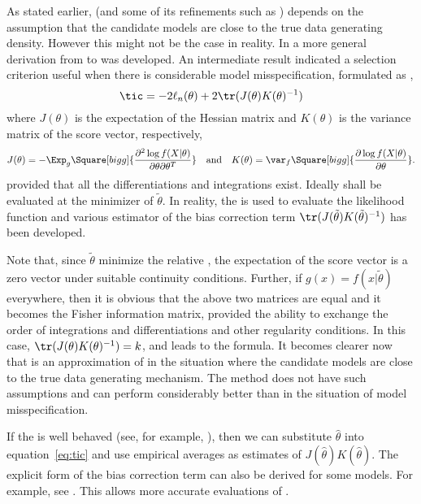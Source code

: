 As stated earlier, \aic (and some of its refinements such as \aicc) depends on
the assumption that the candidate models are close to the true data generating
density. However this might not be the case in reality. In
\cite{Takeuchi:1976vx} a more general derivation from \kld to \aic was
developed. An intermediate result indicated a selection criterion useful when
there is considerable model misspecification, formulated as \tic,
\begin{equation}
  \tic = -2\ell_n(\theta) + 2\tr(J(\theta)K(\theta)^{-1})
  \label{eq:tic}
\end{equation}
where $J(\theta)$ is the expectation of the Hessian matrix and $K(\theta)$ is
the variance matrix of the score vector, respectively,
\begin{equation}
  J(\theta) = -\Exp_g\Square[bigg]{
    \frac{\partial^2\log f(X|\theta)}{\partial\theta\partial\theta^T}
  }\quad\text{and}\quad
  K(\theta) = \var_f\Square[bigg]{
    \frac{\partial\log f(X|\theta)}{\partial\theta}
  }.
\end{equation}
provided that all the differentiations and integrations exist. Ideally \tic
shall be evaluated at the minimizer of \kld $\tilde\theta$. In reality, the
\mle is used to evaluate the likelihood function and various estimator of the
bias correction term $\tr(J(\tilde\theta)K(\tilde\theta)^{-1})$ has been
developed.

Note that, since $\tilde\theta$ minimize the relative \kld, the expectation of
the score vector is a zero vector under suitable continuity conditions.
Further, if $g(x) = f(x|\tilde\theta)$ everywhere, then it is obvious that the
above two matrices are equal and it becomes the Fisher information matrix,
provided the ability to exchange the order of integrations and
differentiations and other regularity conditions. In this case,
$\tr(J(\theta)K(\theta)^{-1}) = k$, and \tic leads to the \aic formula. It
becomes clearer now that \aic is an approximation of \tic in the situation
where the candidate models are close to the true data generating mechanism.
The \tic method does not have such assumptions and can perform considerably
better than \aic in the situation of model misspecification.

If the \mle is well behaved (see, for example, \cite{Lehmann:1983vx}), then we
can substitute \mle $\hat\theta$ into equation~\ref{eq:tic} and use empirical
averages as estimates of $J(\hat\theta)K(\hat\theta)$. The explicit form of
the bias correction term can also be derived for some models. For example, see
\cite[][sec.~6.6]{Burnham:2002wc}. This allows more accurate evaluations of
\tic.

